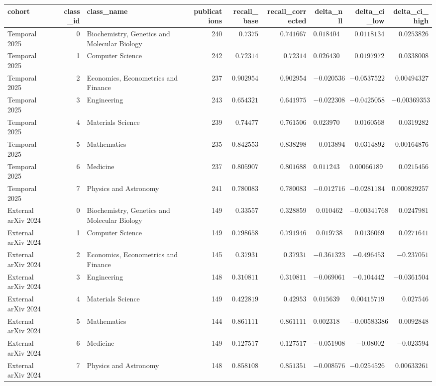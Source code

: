 \begin{tabular}{lrlrrrrrr}
\toprule
cohort & class\_id & class\_name & publications & recall\_base & recall\_corrected & delta\_nll & delta\_ci\_low & delta\_ci\_high \\
\midrule
Temporal 2025 & 0 & Biochemistry, Genetics and Molecular Biology & 240 & $0.7375$ & $0.741667$ & $0.0184049$ & $0.0118134$ & $0.0253826$ \\
Temporal 2025 & 1 & Computer Science & 242 & $0.72314$ & $0.72314$ & $0.0264308$ & $0.0197972$ & $0.0338008$ \\
Temporal 2025 & 2 & Economics, Econometrics and Finance & 237 & $0.902954$ & $0.902954$ & $-0.0205365$ & $-0.0537522$ & $0.00494327$ \\
Temporal 2025 & 3 & Engineering & 243 & $0.654321$ & $0.641975$ & $-0.0223086$ & $-0.0425058$ & $-0.00369353$ \\
Temporal 2025 & 4 & Materials Science & 239 & $0.74477$ & $0.761506$ & $0.0239704$ & $0.0160568$ & $0.0319282$ \\
Temporal 2025 & 5 & Mathematics & 235 & $0.842553$ & $0.838298$ & $-0.0138946$ & $-0.0314892$ & $0.00164876$ \\
Temporal 2025 & 6 & Medicine & 237 & $0.805907$ & $0.801688$ & $0.0112433$ & $0.000661899$ & $0.0215456$ \\
Temporal 2025 & 7 & Physics and Astronomy & 241 & $0.780083$ & $0.780083$ & $-0.0127169$ & $-0.0281184$ & $0.000829257$ \\
External arXiv 2024 & 0 & Biochemistry, Genetics and Molecular Biology & 149 & $0.33557$ & $0.328859$ & $0.010462$ & $-0.00341768$ & $0.0247981$ \\
External arXiv 2024 & 1 & Computer Science & 149 & $0.798658$ & $0.791946$ & $0.019738$ & $0.0136069$ & $0.0271641$ \\
External arXiv 2024 & 2 & Economics, Econometrics and Finance & 145 & $0.37931$ & $0.37931$ & $-0.361323$ & $-0.496453$ & $-0.237051$ \\
External arXiv 2024 & 3 & Engineering & 148 & $0.310811$ & $0.310811$ & $-0.0690615$ & $-0.104442$ & $-0.0361504$ \\
External arXiv 2024 & 4 & Materials Science & 149 & $0.422819$ & $0.42953$ & $0.0156398$ & $0.00415719$ & $0.027546$ \\
External arXiv 2024 & 5 & Mathematics & 144 & $0.861111$ & $0.861111$ & $0.00231852$ & $-0.00583386$ & $0.0092848$ \\
External arXiv 2024 & 6 & Medicine & 149 & $0.127517$ & $0.127517$ & $-0.0519086$ & $-0.08002$ & $-0.023594$ \\
External arXiv 2024 & 7 & Physics and Astronomy & 148 & $0.858108$ & $0.851351$ & $-0.00857639$ & $-0.0254526$ & $0.00633261$ \\
\bottomrule
\end{tabular}
